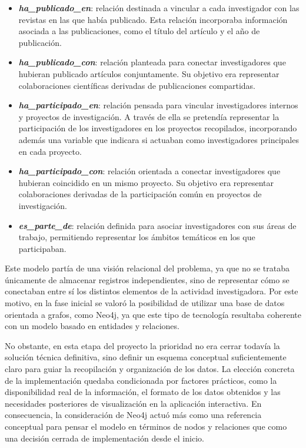 \documentclass[11pt,spanish,listoffigures,listoftables]{tfgetsinf}
\begin{document}
\begin{itemize}
    \item \textbf{\textit{ha\_publicado\_en}}: relación destinada a vincular a cada investigador con las revistas en las que había publicado. Esta relación incorporaba información asociada a las publicaciones, como el título del artículo y el año de publicación.

    \item \textbf{\textit{ha\_publicado\_con}}: relación planteada para conectar investigadores que hubieran publicado artículos conjuntamente. Su objetivo era representar colaboraciones científicas derivadas de publicaciones compartidas.

    \item \textbf{\textit{ha\_participado\_en}}: relación pensada para vincular investigadores internos y proyectos de investigación. A través de ella se pretendía representar la participación de los investigadores en los proyectos recopilados, incorporando además una variable que indicara si actuaban como investigadores principales en cada proyecto.

    \item \textbf{\textit{ha\_participado\_con}}: relación orientada a conectar investigadores que hubieran coincidido en un mismo proyecto. Su objetivo era representar colaboraciones derivadas de la participación común en proyectos de investigación.

    \item \textbf{\textit{es\_parte\_de}}: relación definida para asociar investigadores con sus áreas de trabajo, permitiendo representar los ámbitos temáticos en los que participaban.
\end{itemize}

Este modelo partía de una visión relacional del problema, ya que no se trataba únicamente de almacenar registros independientes, sino de representar cómo se conectaban entre sí los distintos elementos de la actividad investigadora. Por este motivo, en la fase inicial se valoró la posibilidad de utilizar una base de datos orientada a grafos, como Neo4j, ya que este tipo de tecnología resultaba coherente con un modelo basado en entidades y relaciones.

No obstante, en esta etapa del proyecto la prioridad no era cerrar todavía la solución técnica definitiva, sino definir un esquema conceptual suficientemente claro para guiar la recopilación y organización de los datos. La elección concreta de la implementación quedaba condicionada por factores prácticos, como la disponibilidad real de la información, el formato de los datos obtenidos y las necesidades posteriores de visualización en la aplicación interactiva. En consecuencia, la consideración de Neo4j actuó más como una referencia conceptual para pensar el modelo en términos de nodos y relaciones que como una decisión cerrada de implementación desde el inicio.
\end{document}
